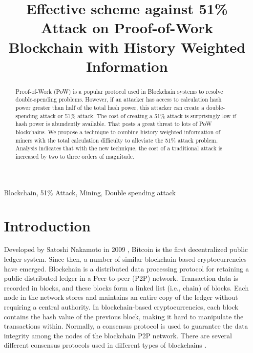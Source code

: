 \documentclass[conference]{IEEEtran}
\begin{document}
\title{Effective scheme against 51\% Attack on Proof-of-Work Blockchain with History Weighted Information\\
}

\author{
}

\maketitle

\begin{abstract}
Proof-of-Work (PoW) is a popular protocol used in Blockchain systems to resolve double-spending problems. However, if an attacker has access to calculation hash power greater than half of the total hash power, this attacker can create a double-spending attack or 51\% attack. The cost of creating a 51\% attack is surprisingly low if hash power is abundently available. That posts a great threat to lots of PoW blockchains. We propose a technique to combine history weighted information of miners with the total calculation difficulty to alleviate the 51\% attack problem. Analysis indicates that with the new technique, the cost of a traditional attack is increased by two to three orders of magnitude.
\end{abstract}


\begin{IEEEkeywords}
Blockchain, 51\% Attack, Mining, Double spending attack
\end{IEEEkeywords}

\section{Introduction}
Developed by Satoshi Nakamoto in 2009 \cite{b1}, Bitcoin is the first decentralized public ledger system. Since then, a number of similar blockchain-based cryptocurrencies have emerged. Blockchain is a distributed data processing protocol for retaining a public distributed ledger in a Peer-to-peer (P2P) network. Transaction data is recorded in blocks, and these blocks form a linked list (i.e., chain) of blocks. Each node in the network stores and maintains an entire copy of the ledger without requiring a central authority. In blockchain-based cryptocurrencies, each block contains the hash value of the previous block, making it hard to manipulate the transactions within. Normally, a consensus protocol is used to guarantee the data integrity among the nodes of the blockchain P2P network. There are several different consensus protocols used in different types of blockchains \cite{b2}.
\end{document}
